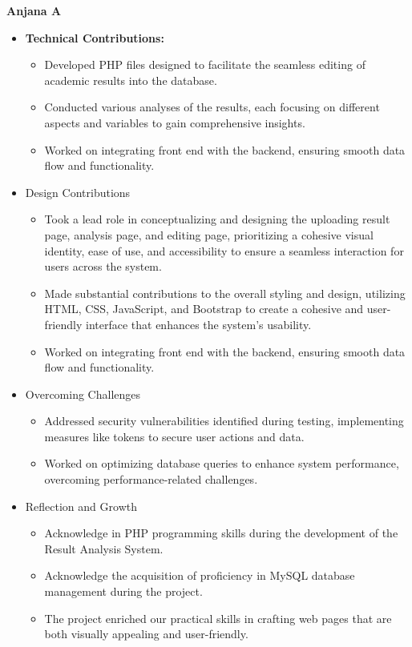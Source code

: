 \documentclass{nascproject}
\begin{document}
\textbf{Anjana A}
\begin{itemize}
	\item \textbf{Technical Contributions:}
	
	\begin{itemize}
		\item Developed PHP files designed to facilitate the seamless editing of academic results into the database.
		\item Conducted various analyses of the results, each focusing on different aspects and variables to gain comprehensive insights.
		\item Worked on integrating front end with the backend, ensuring smooth
		data flow and functionality.
	\end{itemize}
	\item Design Contributions
	\begin{itemize}
		\item Took a lead role in conceptualizing and designing the uploading result page, analysis page, and editing page, prioritizing a cohesive visual identity, ease of use, and accessibility to ensure a seamless interaction for users across the system.
		\item Made substantial contributions to the overall styling and design, utilizing HTML, CSS, JavaScript, and Bootstrap to create a cohesive and user-friendly interface that enhances the system's usability.
		\item Worked on integrating front end with the backend, ensuring smooth
		data flow and functionality.
	\end{itemize}
	
	\item Overcoming Challenges
	\begin{itemize}
		\item Addressed security vulnerabilities identified during testing, implementing measures like tokens to secure user actions and data.
		\item Worked on optimizing database queries to enhance system performance, overcoming performance-related challenges.
	\end{itemize}
	
	\item Reflection and Growth
		\begin{itemize}
		\item Acknowledge in PHP programming skills during the development of the Result Analysis System.
		\item Acknowledge the acquisition of proficiency in MySQL database management during the project.
		\item The project enriched our practical skills in crafting web pages that are both visually appealing and user-friendly.
		\end{itemize}
\end{itemize}
\end{document}
